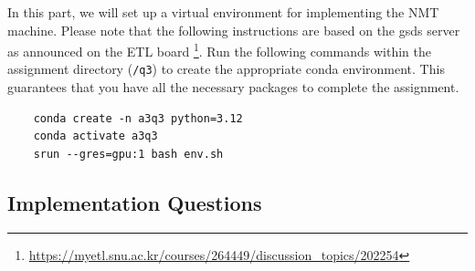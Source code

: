 \documentclass{assignment format}
\begin{document}
In this part, we will set up a virtual environment for implementing the NMT machine. Please note that the following instructions are based on the gsds server as announced on the ETL board \footnote{\url{https://myetl.snu.ac.kr/courses/264449/discussion_topics/202254}}. Run the following commands within the assignment directory (\texttt{/q3}) to create the appropriate conda environment. This guarantees that you have all the necessary packages to complete the assignment. 

\begin{verbatim}
    conda create -n a3q3 python=3.12
    conda activate a3q3
    srun --gres=gpu:1 bash env.sh
\end{verbatim}


\subsection{Implementation Questions}
\end{document}
